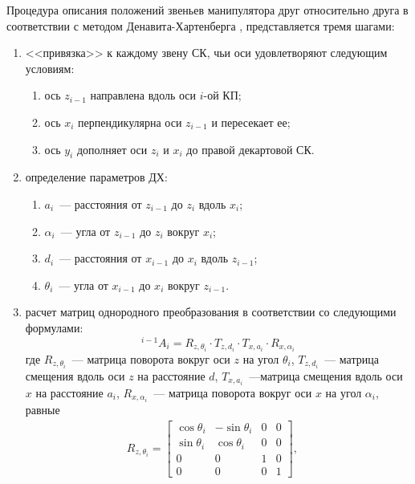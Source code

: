 Процедура описания положений звеньев манипулятора друг относительно друга в соответствии с методом Денавита-Хартенберга \cite{spong2005robot}, представляется тремя шагами:
\begin{enumerate}
    \item <<привязка>> к каждому звену СК, чьи оси удовлетворяют следующим условиям:
    \begin{enumerate}
	    \item ось $z_{i-1}$ направлена вдоль оси $i$-ой КП;
        \item ось $x_i$ перпендикулярна оси $z_{i-1}$ и пересекает ее;
        \item ось $y_i$ дополняет оси $z_i$ и $x_i$ до правой декартовой СК.
    \end{enumerate}
    \item определение параметров ДХ:
    \begin{enumerate}
	    \item $a_i$~--- расстояния от $z_{i-1}$ до $z_i$ вдоль $x_i$;
	    \item $\alpha_i$~--- угла от $z_{i-1}$ до $z_i$ вокруг $x_i$;
        \item $d_i$~--- расстояния от $x_{i-1}$ до $x_i$ вдоль $z_{i-1}$;
        \item $\theta_i$~--- угла от $x_{i-1}$ до $x_i$ вокруг $z_{i-1}$.
    \end{enumerate}
    \item расчет матриц однородного преобразования в соответствии со следующими формулами:
    \begin{equation}\label{DH_matrix}
        {}^{i-1}A_{i} = R_{z, \theta_i} \cdot T_{z, d_i} \cdot T_{x, a_i} \cdot R_{x, \alpha_i}
    \end{equation}
    где $R_{z, \theta_i}$~--- матрица поворота вокруг оси $z$ на угол $\theta_i$, $T_{z, d_i}$~--- матрица смещения вдоль оси $z$ на расстояние $d$, $T_{x, a_i}$~---матрица смещения вдоль оси $x$ на расстояние $a_i$,  $R_{x, \alpha_i}$~--- матрица поворота вокруг оси $x$ на угол $\alpha_i$, равные
    \begin{gather}
        R_{z, \theta_i} =
        \begin{bmatrix}
            \cos\theta_i & -\sin\theta_i & 0 & 0\\
            \sin\theta_i &  \cos\theta_i & 0 & 0\\
            0 & 0 & 1 & 0\\
            0 & 0 & 0 & 1
        \end{bmatrix}\!\!,
        \quad

\end{gather}
\end{enumerate}

